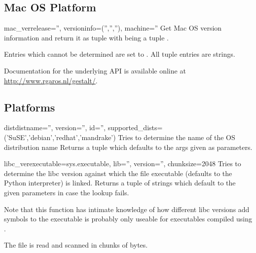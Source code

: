 \subsection{Mac OS Platform}

\begin{funcdesc}{mac_ver}{release='', versioninfo=('','',''), machine=''}
  Get Mac OS version information and return it as tuple
   with
   being a tuple .

  Entries which cannot be determined are set to .  All tuple
  entries are strings.

  Documentation for the underlying  API is
  available online at \url{http://www.rgaros.nl/gestalt/}.
\end{funcdesc}


\subsection{\UNIX{} Platforms}

\begin{funcdesc}{dist}{distname='', version='', id='',
                       supported_dists=('SuSE','debian','redhat','mandrake')}
  Tries to determine the name of the OS distribution name
  Returns a tuple 
  which defaults to the args given as parameters.
\end{funcdesc}


\begin{funcdesc}{libc_ver}{executable=sys.executable, lib='',
                           version='', chunksize=2048}
  Tries to determine the libc version against which the file
  executable (defaults to the Python interpreter) is linked.  Returns
  a tuple of strings  which default
  to the given parameters in case the lookup fails.

  Note that this function has intimate knowledge of how different
  libc versions add symbols to the executable is probably only
  useable for executables compiled using .

  The file is read and scanned in chunks of  bytes.
\end{funcdesc}
